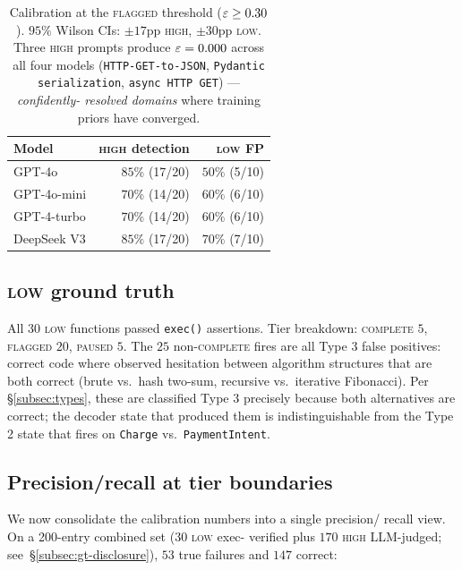 \begin{table}[h]
\centering
\small
\begin{tabular}{lrr}
\toprule
Model & \textsc{high} detection & \textsc{low} FP \\
\midrule
GPT-4o         & $85\%$ (17/20) & $50\%$ (5/10) \\
GPT-4o-mini    & $70\%$ (14/20) & $60\%$ (6/10) \\
GPT-4-turbo    & $70\%$ (14/20) & $60\%$ (6/10) \\
DeepSeek V3    & $85\%$ (17/20) & $70\%$ (7/10) \\
\bottomrule
\end{tabular}
\caption{Calibration at the \textsc{flagged} threshold ($\varepsilon \ge
0.30$). $95\%$ Wilson CIs: $\pm 17$pp \textsc{high}, $\pm 30$pp
\textsc{low}. Three \textsc{high} prompts produce $\varepsilon = 0.000$
across all four models (\texttt{HTTP-GET-to-JSON}, \texttt{Pydantic
serialization}, \texttt{async HTTP GET}) --- \emph{confidently-%
resolved domains} where training priors have converged.}
\label{tab:calibration}
\end{table}

\subsection{\textsc{low} ground truth}
\label{subsec:low-gt}

All $30$ \textsc{low} functions passed \texttt{exec()} assertions.
Tier breakdown: \textsc{complete} $5$, \textsc{flagged} $20$,
\textsc{paused} $5$. The $25$ non-\textsc{complete} fires are all
Type 3 false positives: correct code where \eps observed hesitation
between algorithm structures that are both correct (brute vs.\ hash
two-sum, recursive vs.\ iterative Fibonacci). Per
\S\ref{subsec:types}, these are classified Type 3 precisely because
both alternatives are correct; the decoder state that produced them
is indistinguishable from the Type 2 state that fires on
\texttt{Charge} vs.\ \texttt{PaymentIntent}.

\subsection{Precision/recall at tier boundaries}
\label{subsec:pr}

We now consolidate the calibration numbers into a single precision/
recall view. On a 200-entry combined set ($30$ \textsc{low} exec-%
verified plus $170$ \textsc{high} LLM-judged;
see~\S\ref{subsec:gt-disclosure}), $53$ true failures and $147$
correct:

